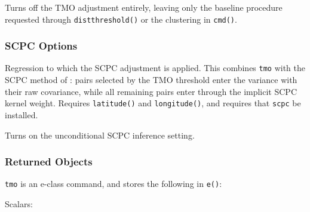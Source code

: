 \documentclass[varwidth,bib]{statapress}
\begin{document}
 Turns off the TMO adjustment entirely, leaving only the baseline procedure requested through {\tt distthreshold()} or the clustering in {\tt cmd()}.

\subsubsection*{SCPC Options}
 Regression to which the SCPC adjustment is applied.  This combines {\tt tmo} with the SCPC method of \citet{MullerWatson2022}: pairs selected by the TMO threshold enter the variance with their raw covariance, while all remaining pairs enter through the implicit SCPC kernel weight.  Requires {\tt latitude()} and {\tt longitude()}, and requires that {\tt scpc} be installed.

 Turns on the unconditional SCPC inference setting.
\subsubsection{Returned Objects}
\texttt{tmo} is an e-class command, and stores the following in \texttt{e()}:

\noindent Scalars:
\end{document}
